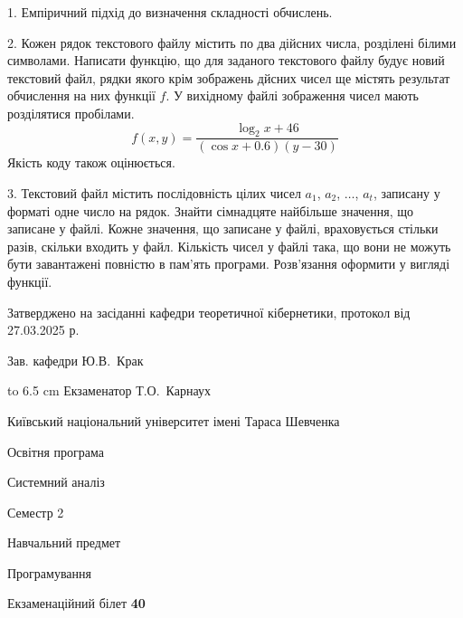 \documentclass[12pt, ukrainian]{article}
\begin{document}
{%
1. Емпіричний підхід до визначення складності обчислень.%
\par
\vspace{2mm}

2. Кожен рядок текстового файлу містить по два дійсних числа, розділені білими символами.
Написати функцію, що для заданого текстового файлу будує новий текстовий файл, рядки якого крім зображень дйсних чисел ще містять результат обчислення на них функції $f$. У вихідному файлі зображення чисел мають розділятися пробілами. 
$$f(x, y) =\frac{\log_{2} x + 46}{(\cos x + 0.6) (y - 30)}$$ 
Якість коду також оцінюється.

\par
\vspace{2mm}

3. Текстовий файл містить послідовність цілих чисел $a_1$, $a_2$, $\ldots$, $a_t$, записану у форматі одне число на рядок. Знайти сімнадцяте найбільше значення, що записане у файлі. Кожне значення, що записане у файлі, враховується стільки разів, скільки входить у файл. Кількість чисел у файлі така, що вони не можуть бути завантажені повністю в пам'ять програми. Розв'язання оформити у вигляді функції.

}
{\smallskip\smallskip \begin {scriptsize} Затверджено на засіданні кафедри теоретичної кібернетики, протокол   від   27.03.2025 р.\par\smallskip\smallskip\smallskip\smallskip
{\parbox {6.5 cm} {Зав. кафедри \dotfill Ю.В.~Крак}}\hspace {0.7cm} {\hbox to 6.5 cm { Екзаменатор \dotfill Т.О.~Карнаух}} \end{scriptsize}}
\vspace{2.9cm}
{{\begin {scriptsize}\par
{ \center  Київський національний університет імені Тараса Шевченка \par}
{\parbox {5 cm}{Освітня програма \hfill}{\parbox {7 cm}{Системний аналіз\hfill}}\parbox {6 cm}{\hfill Семестр 2}}\par
{\parbox {5 cm} {Навчальний предмет \hfill}\parbox {7 cm}{Програмування \hfill}\parbox {6cm}{\hfill}\par}\vspace{-15pt} \end{scriptsize}}{\center Екзаменаційний білет \No \textbf { 40 }\par}}
\end{document}
